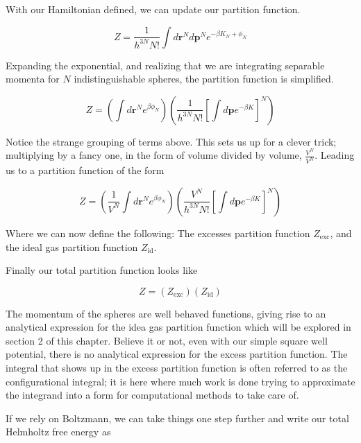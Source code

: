 With our Hamiltonian defined, we can update our partition function.

\begin{equation}
Z = \frac{1}{h^{3N} N!} \int d\textbf{r}^N d\textbf{p}^N e^{-\beta K_N + \phi_N }
\end{equation} 

Expanding the exponential, and realizing that we are integrating separable momenta for $N$ indistinguishable spheres, the partition function is simplified.

\begin{equation}
Z = \left( \int d\textbf{r}^N e^{\beta \phi_N} \right)  \left( \frac{1}{h^{3N} N!}  \left[ \int d\textbf{p} e^{-\beta K } \right]^N \right)
\end{equation} 

Notice the strange grouping of terms above.  This sets us up for a clever trick; multiplying by a fancy one, in the form of volume divided by volume, $\frac{V^N}{V^N}$.  Leading us to a partition function of the form


\begin{equation}
Z = \left( \frac{1}{V^N} \int d\textbf{r}^N e^{\beta \phi_N} \right)  \left( \frac{V^N}{h^{3N} N!}  \left[ \int d\textbf{p} e^{-\beta K } \right]^N \right)
\end{equation} 

Where we can now define the following:  The excesses partition function $Z_{\text{exc}}$, and the ideal gas partition function $Z_{\text{id}}$.

Finally our total partition function looks like

\begin{equation}
Z = (Z_{\text{exc}})(Z_{\text{id}})
\end{equation}

The momentum of the spheres are well behaved functions, giving rise to an analytical expression for the idea gas partition function which will be explored in section 2 of this chapter.  Believe it or not, even with our simple square well potential, there is no analytical expression for the excess partition function.  The integral that shows up in the excess partition function is often referred to as the configurational integral;  it is here where much work is done trying to approximate the integrand into a form for computational methods to take care of.  

If we rely on Boltzmann, we can take things one step further and write our total Helmholtz free energy as

